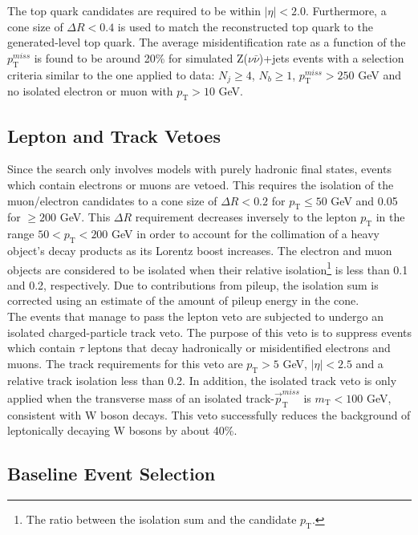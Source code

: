 The top quark candidates are required to be within $|\eta| < 2.0$. Furthermore, a cone size of $\Delta R < 0.4$ is used to match the reconstructed top quark to the generated-level top quark. The average misidentification rate as a function of the $p_\text{T}^{miss}$ is found to be around 20\% for simulated Z($\nu\bar{\nu}$)+jets events with a selection criteria similar to the one applied to data: $N_j \geq 4$, $N_b \geq 1$, $p_\text{T}^{miss} > 250$ GeV and no isolated electron or muon with $p_\text{T} > 10$ GeV.


\subsection{Lepton and Track Vetoes}

Since the search only involves models with purely hadronic final states, events which contain electrons or muons are vetoed. This requires the isolation of the muon/electron candidates to a cone size of $\Delta R < 0.2$ for $p_\text{T} \leq 50$ GeV and 0.05 for $\geq 200$ GeV. This $\Delta R$ requirement decreases inversely to the lepton $p_\text{T}$ in the range $50 < p_\text{T} < 200$ GeV in order to account for the collimation of a heavy object's decay products as its Lorentz boost increases. The electron and muon objects are considered to be isolated when their relative isolation\footnote{The ratio between the isolation sum and the candidate $p_\text{T}$.} is less than 0.1 and 0.2, respectively. Due to contributions from pileup, the isolation sum is corrected using an estimate of the amount of pileup energy in the cone.\\

The events that manage to pass the lepton veto are subjected to undergo an isolated charged-particle track veto. The purpose of this veto is to suppress events which contain $\tau$ leptons that decay hadronically or misidentified electrons and muons. The track requirements for this veto are $p_\text{T} > 5$ GeV, $|\eta| < 2.5$ and a relative track isolation less than 0.2. In addition, the isolated track veto is only applied when the transverse mass of an isolated track-$\vec{p}_\text{T}^{miss}$ is $m_\text{T} < 100$ GeV, consistent with W boson decays. This veto successfully reduces the background of leptonically decaying W bosons by about 40\%.

\subsection{Baseline Event Selection}

